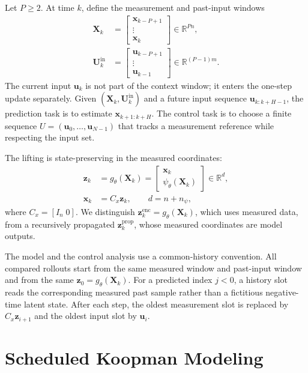 ﻿\documentclass[journal]{IEEEtran}
\newcommand{\vx}{\mathbf{x}}
\newcommand{\vu}{\mathbf{u}}
\newcommand{\vz}{\mathbf{z}}
\newcommand{\mU}{\mathbf{U}}
\newcommand{\mX}{\mathbf{X}}
\newcommand{\R}{\mathbb{R}}
\begin{document}
Let $P\ge2$. At time $k$, define the measurement and past-input windows
\begin{align}
    \mX_k&=\begin{bmatrix}\vx_{k-P+1}\\ \vdots\\ \vx_k\end{bmatrix}\in\R^{Pn},
    \label{eq:measurement_window}\\
    \mU_k^{\mathrm{in}}&=\begin{bmatrix}\vu_{k-P+1}\\ \vdots\\ \vu_{k-1}\end{bmatrix}\in\R^{(P-1)m}.
    \label{eq:history_windows}
\end{align}
The current input $\vu_k$ is not part of the context window; it enters the one-step update separately. Given $(\mX_k,\mU_k^{\mathrm{in}})$ and a future input sequence $\vu_{k:k+H-1}$, the prediction task is to estimate $\vx_{k+1:k+H}$. The control task is to choose a finite sequence $U=(\vu_0,\ldots,\vu_{N-1})$ that tracks a measurement reference while respecting the input set.

The lifting is state-preserving in the measured coordinates:
\begin{align}
    \vz_k&=g_\theta(\mX_k)=\begin{bmatrix}\vx_k\\ \psi_\theta(\mX_k)\end{bmatrix}\in\R^d,
    \label{eq:state_preserving_lifting}\\
    \vx_k&=C_x\vz_k,\qquad d=n+n_\psi,
    \label{eq:state_readout}
\end{align}
where $C_x=[I_n\;0]$. We distinguish $\vz_k^{\mathrm{enc}}=g_\theta(\mX_k)$, which uses measured data, from a recursively propagated $\vz_k^{\mathrm{prop}}$, whose measured coordinates are model outputs.

The model and the control analysis use a common-history convention. All compared rollouts start from the same measured window and past-input window and from the same $\vz_0=g_\theta(\mX_k)$. For a predicted index $j<0$, a history slot reads the corresponding measured past sample rather than a fictitious negative-time latent state. After each step, the oldest measurement slot is replaced by $C_x\vz_{i+1}$ and the oldest input slot by $\vu_i$.

\section{Scheduled Koopman Modeling}
\label{sec:model}
\end{document}
